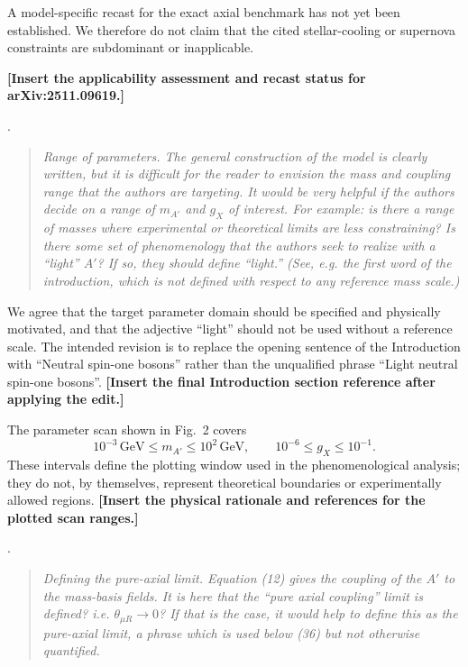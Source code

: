 \documentclass[12pt,a4paper]{article}
\begin{document}
A model-specific recast for the exact axial benchmark has not yet been established. We therefore do not claim that the cited stellar-cooling or supernova constraints are subdominant or inapplicable.

\textbf{[Insert the applicability assessment and recast status for arXiv:2511.09619.]}

\medskip
{}. \begin{quote}\itshape
Range of parameters. The general construction of the model is clearly written, but it is difficult for the reader to envision the mass and coupling range that the authors are targeting. It would be very helpful if the authors decide on a range of \(m_{A'}\) and \(g_X\) of interest. For example: is there a range of masses where experimental or theoretical limits are less constraining? Is there some set of phenomenology that the authors seek to realize with a ``light'' \(A'\)? If so, they should define ``light.'' (See, e.g. the first word of the introduction, which is not defined with respect to any reference mass scale.)\end{quote}

We agree that the target parameter domain should be specified and physically motivated, and that the adjective ``light'' should not be used without a reference scale. The intended revision is to replace the opening sentence of the Introduction with ``Neutral spin-one bosons'' rather than the unqualified phrase ``Light neutral spin-one bosons''. \textbf{[Insert the final Introduction section reference after applying the edit.]}

The parameter scan shown in Fig.~2 covers
\[
10^{-3}\,\mathrm{GeV}\leq m_{A'}\leq10^2\,\mathrm{GeV},
\qquad
10^{-6}\leq g_X\leq10^{-1}.
\]
These intervals define the plotting window used in the phenomenological analysis; they do not, by themselves, represent theoretical boundaries or experimentally allowed regions. \textbf{[Insert the physical rationale and references for the plotted scan ranges.]}

\medskip
{}.
\begin{quote}\itshape
Defining the pure-axial limit. Equation (12) gives the coupling of the \(A'\) to the mass-basis fields. It is here that the ``pure axial coupling'' limit is defined? i.e. \(\theta_{\mu R}\to0\)? If that is the case, it would help to define this as the pure-axial limit, a phrase which is used below (36) but not otherwise quantified.
\end{quote}
\end{document}
